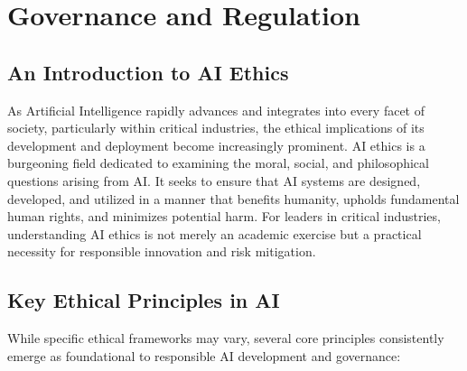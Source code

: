 \chapter{Governance and Regulation}
\label{chap:governance_and_regulation}

\section{An Introduction to AI Ethics}
\label{sec:ai_ethics_introduction}
As Artificial Intelligence rapidly advances and integrates into every facet of society, particularly within critical industries, the ethical implications of its development and deployment become increasingly prominent. AI ethics is a burgeoning field dedicated to examining the moral, social, and philosophical questions arising from AI. It seeks to ensure that AI systems are designed, developed, and utilized in a manner that benefits humanity, upholds fundamental human rights, and minimizes potential harm. For leaders in critical industries, understanding AI ethics is not merely an academic exercise but a practical necessity for responsible innovation and risk mitigation.

\section{Key Ethical Principles in AI}
\label{sec:ethical_principles}
While specific ethical frameworks may vary, several core principles consistently emerge as foundational to responsible AI development and governance:


